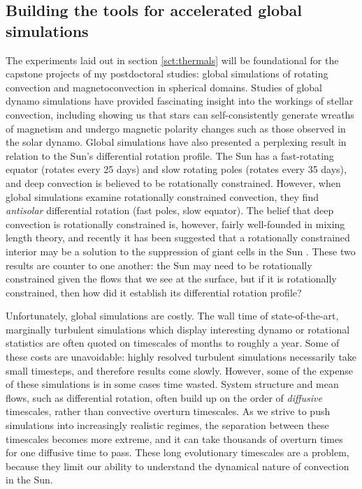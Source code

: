\documentclass[aasms,12pt]{article}
\begin{document}
\subsection{Building the tools for accelerated global simulations}
The experiments laid out in section \ref{sct:thermals} will be foundational for the capstone projects of my postdoctoral studies: global simulations of rotating convection and magnetoconvection in spherical domains.
Studies of global dynamo simulations have provided fascinating insight into the workings of stellar convection, including showing us that stars can self-consistently generate wreaths of magnetism and undergo magnetic polarity changes such as those observed in the solar dynamo.
Global simulations have also presented a perplexing result in relation to the Sun's differential rotation profile.
The Sun has a fast-rotating equator (rotates every 25 days) and slow rotating poles (rotates every 35 days), and deep convection is believed to be rotationally constrained.
However, when global simulations examine rotationally constrained convection, they find \emph{antisolar} differential rotation (fast poles, slow equator).
The belief that deep convection is rotationally constrained is, however, fairly well-founded in mixing length theory, and recently it has been suggested that a rotationally constrained interior may be a solution to the suppression of giant cells in the Sun \citep{featherstone&hindman2016}.
These two results are counter to one another: the Sun may need to be rotationally constrained given the flows that we see at the surface, but if it is rotationally constrained, then how did it establish its differential rotation profile?

Unfortunately, global simulations are costly.
The wall time of state-of-the-art, marginally turbulent simulations which display interesting dynamo or rotational statistics are often quoted on timescales of months to roughly a year.
Some of these costs are unavoidable: highly resolved turbulent simulations necessarily take small timesteps, and therefore results come slowly.
However, some of the expense of these simulations is in some cases time wasted.
System structure and mean flows, such as differential rotation, often build up on the order of \emph{diffusive} timescales, rather than convective overturn timescales.
As we strive to push simulations into increasingly realistic regimes, the separation between these timescales becomes more extreme, and it can take thousands of overturn times for one diffusive time to pass.
These long evolutionary timescales are a problem, because they limit our ability to understand the dynamical nature of convection in the Sun.
\end{document}

